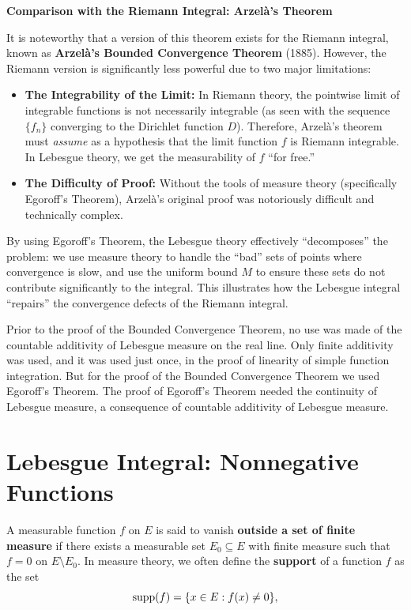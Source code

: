 \documentclass[../main.tex]{subfiles}
\begin{document}
\begin{remark}
	\textbf{Comparison with the Riemann Integral: Arzelà's Theorem}

	It is noteworthy that a version of this theorem exists for the Riemann integral, known as \textbf{Arzelà's Bounded Convergence Theorem} (1885). However, the Riemann version is significantly less powerful due to two major limitations:
	\begin{itemize}
		\item \textbf{The Integrability of the Limit:} In Riemann theory, the pointwise limit of integrable functions is not necessarily integrable (as seen with the sequence $\{f_n\}$ converging to the Dirichlet function $D$). Therefore, Arzelà's theorem must \textit{assume} as a hypothesis that the limit function $f$ is Riemann integrable. In Lebesgue theory, we get the measurability of $f$ ``for free.''
		\item \textbf{The Difficulty of Proof:} Without the tools of measure theory (specifically Egoroff's Theorem), Arzelà's original proof was notoriously difficult and technically complex.
	\end{itemize}
	By using Egoroff's Theorem, the Lebesgue theory effectively ``decomposes'' the problem: we use measure theory to handle the ``bad'' sets of points where convergence is slow, and use the uniform bound $M$ to ensure these sets do not contribute significantly to the integral. This illustrates how the Lebesgue integral ``repairs'' the convergence defects of the Riemann integral.
\end{remark}

Prior to the proof of the Bounded Convergence Theorem, no use was made of the countable additivity of Lebesgue measure on the real line. Only finite additivity was used, and it was used just once, in the proof of linearity of simple function integration. But for the proof of the Bounded Convergence Theorem we used Egoroff's Theorem. The proof of Egoroff's Theorem needed the continuity of Lebesgue measure, a consequence of countable additivity of Lebesgue measure.

\section{Lebesgue Integral: Nonnegative Functions}
A measurable function $f$ on $E$ is said to vanish \textbf{outside a set of finite measure} if there exists a measurable set $E_0 \subseteq E$ with finite measure such that $f = 0$ on $E \setminus E_0$. In measure theory, we often define the \textbf{support} of a function $f$ as the set
\begin{equation}
	\operatorname{supp}(f) = \{x \in E : f(x) \neq 0\},
\end{equation}
\end{document}
